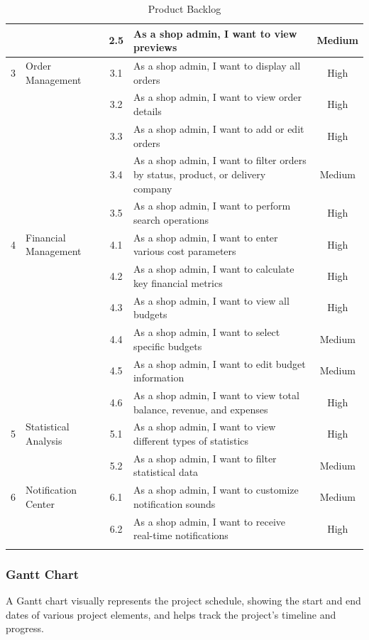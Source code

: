 \begin{longtable}{|c|p{6cm}|c|p{6cm}|c|}
& & 2.5 & As a shop admin, I want to view previews & Medium \\ \hline
\multirow{1}{*}{3} & \multirow{1}{*}{Order Management} & 3.1 & As a shop admin, I want to display all orders & High \\ \cline{3-5}
& & 3.2 & As a shop admin, I want to view order details & High \\ \cline{3-5}
& & 3.3 & As a shop admin, I want to add or edit orders & High \\ \cline{3-5}
& & 3.4 & As a shop admin, I want to filter orders by status, product, or delivery company & Medium \\ \cline{3-5}
& & 3.5 & As a shop admin, I want to perform search operations & High \\ \hline
\multirow{1}{*}{4} & \multirow{1}{*}{Financial Management} & 4.1 & As a shop admin, I want to enter various cost parameters & High \\ \cline{3-5}
& & 4.2 & As a shop admin, I want to calculate key financial metrics & High \\ \cline{3-5}
& & 4.3 & As a shop admin, I want to view all budgets & High \\ \cline{3-5}
& & 4.4 & As a shop admin, I want to select specific budgets & Medium \\ \cline{3-5}
& & 4.5 & As a shop admin, I want to edit budget information & Medium \\ \cline{3-5}
& & 4.6 & As a shop admin, I want to view total balance, revenue, and expenses & High \\ \hline
\multirow{1}{*}{5} & \multirow{1}{*}{Statistical Analysis} & 5.1 & As a shop admin, I want to view different types of statistics & High \\ \cline{3-5}
& & 5.2 & As a shop admin, I want to filter statistical data & Medium \\ \hline
\multirow{1}{*}{6} & \multirow{1}{*}{Notification Center} & 6.1 & As a shop admin, I want to customize notification sounds & Medium \\ \cline{3-5}
& & 6.2 & As a shop admin, I want to receive real-time notifications & High \\ \hline

\caption{Product Backlog}
\label{tab:product_backlog}
\end{longtable}

\subsubsection{Gantt Chart}
A Gantt chart visually represents the project schedule, showing the start and end dates of various project elements, and helps track the project's timeline and progress.

